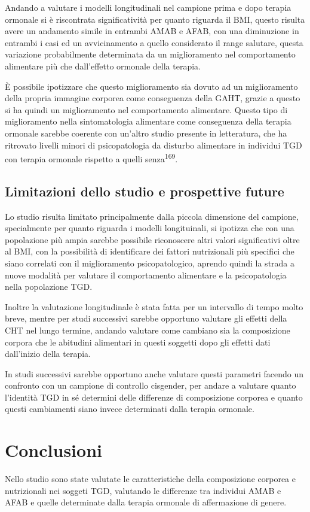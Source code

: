 \documentclass[12pt]{article}
\makeatletter
\newcommand{\cslcitation}[2]
 {\protect\hyper@linkstart{cite}{citeproc_bib_item_#1}#2\hyper@linkend}
\makeatother
\begin{document}
Andando a valutare i modelli longitudinali nel campione prima e dopo terapia ormonale si è riscontrata significatività per quanto riguarda il BMI, questo risulta avere un andamento simile in entrambi AMAB e AFAB, con una diminuzione in entrambi i casi ed un avvicinamento a quello considerato il range salutare, questa variazione probabilmente determinata da un miglioramento nel comportamento alimentare più che dall'effetto ormonale della terapia.

È possibile ipotizzare che questo miglioramento sia dovuto ad un miglioramento della propria immagine corporea come conseguenza della GAHT, grazie a questo si ha quindi un miglioramento nel comportamento alimentare.
Questo tipo di miglioramento nella sintomatologia alimentare come conseguenza della terapia ormonale sarebbe coerente con un'altro studio presente in letteratura, che ha ritrovato livelli minori di psicopatologia da disturbo alimentare in individui TGD con terapia ormonale rispetto a quelli senza\textsuperscript{\cslcitation{169}{169}}.
\subsection{Limitazioni dello studio e prospettive future}
\label{sec:org978f196}
Lo studio risulta limitato principalmente dalla piccola dimensione del campione, specialmente per quanto riguarda i modelli longituinali, si ipotizza che con una popolazione più ampia sarebbe possibile riconoscere altri valori significativi oltre al BMI, con la possibilità di identificare dei fattori nutrizionali più specifici che siano correlati con il miglioramento psicopatologico, aprendo quindi la strada a nuove modalità per valutare il comportamento alimentare e la psicopatologia nella popolazione TGD.

Inoltre la valutazione longitudinale è stata fatta per un intervallo di tempo molto breve, mentre per studi successivi sarebbe opportuno valutare gli effetti della CHT nel lungo termine, andando valutare come cambiano sia la composizione corpora che le abitudini alimentari in questi soggetti dopo gli effetti dati dall'inizio della terapia.

In studi successivi sarebbe opportuno anche valutare questi parametri facendo un confronto con un campione di controllo cisgender, per andare a valutare quanto l'identità TGD in sé determini delle differenze di composizione corporea e quanto questi cambiamenti siano invece determinati dalla terapia ormonale.
\section{Conclusioni}
\label{sec:org7a15022}
Nello studio sono state valutate le caratteristiche della composizione corporea e nutrizionali nei soggeti TGD, valutando le differenze tra individui AMAB e AFAB e quelle determinate dalla terapia ormonale di affermazione di genere.
\end{document}
